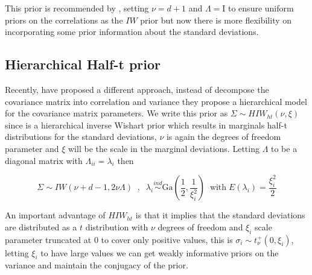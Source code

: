 \documentclass[a4paper]{article}
\newcommand{\I}{\mathrm{I}}
\begin{document}
This prior is recommended by \cite{gelmanhill}, setting $\nu=d+1$ and $\Lambda=\I$ to ensure uniform priors on the correlations as the $IW$ prior but now there is more flexibility on incorporating some prior information about the standard deviations.

\subsection{Hierarchical Half-t prior}

Recently, \cite{huang2013simple} have proposed a different approach, instead of decompose the covariance matrix into correlation and variance they propose a hierarchical model for the covariance matrix parameters. We write this prior as $\Sigma \sim HIW_{ht}(\nu, \xi)$ since is a hierarchical inverse Wishart prior which results in marginals half-t distributions for the standard deviations, $\nu$ is again the degrees of freedom parameter and $\xi$ will be the scale in the marginal deviations.   Letting  $\Lambda$ to be a diagonal matrix with $\Lambda_{ii} =\lambda_i $ then

\begin{equation}
\Sigma \sim IW( \nu + d - 1 ,  2\nu\Lambda) \;\;,\;\;  \lambda_i  \stackrel{ind} \sim \mbox{Ga}(\frac{1}{2} , \frac{1}{\xi_i^2}) \;\; \mbox{with} \; E(\lambda_i)=\frac{\xi_i^2}{2} 
\label{eq:ht}
\end{equation}

An important advantage of  $HIW_{ht}$ is that it implies that the standard deviations are distributed as a $t$ distribution with $\nu$ degrees of freedom and $\xi_i$ scale parameter truncated at 0 to cover only positive values, this is $\sigma_i \sim t_{\nu}^{+}(0, \xi_i)$, letting $\xi_i$ to have large values we can get weakly informative priors on the variance and maintain the conjugacy of the prior.  
\end{document}
